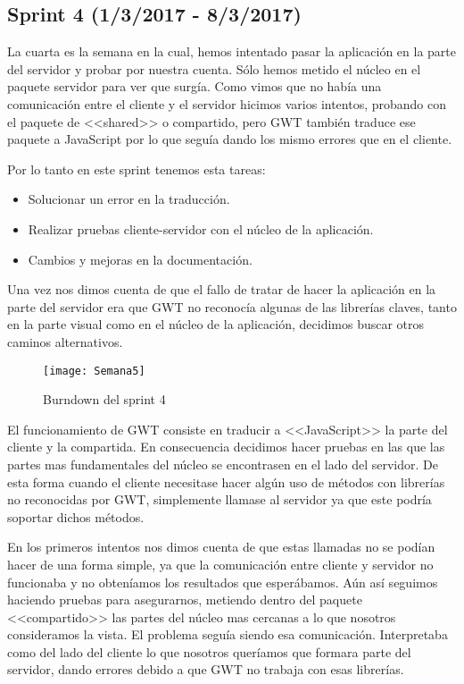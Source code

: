 \subsection{Sprint 4 (1/3/2017 - 8/3/2017)}
La cuarta es la semana en la cual, hemos intentado pasar la aplicación en la parte del servidor y probar por nuestra cuenta. Sólo hemos metido el núcleo en el paquete servidor para ver que surgía. Como vimos que no había una comunicación entre el cliente y el servidor hicimos varios intentos, probando con el paquete de <<shared>> o compartido, pero GWT también traduce ese paquete a JavaScript por lo que seguía dando los mismo errores que en el cliente.

Por lo tanto en este sprint tenemos esta tareas:

\begin{itemize}
\item Solucionar un error en la traducción.
\item Realizar pruebas cliente-servidor con el núcleo de la aplicación.
\item Cambios y mejoras en la documentación.
\end{itemize}

Una vez nos dimos cuenta de que el fallo de tratar de hacer la aplicación en la parte del servidor era que GWT no reconocía algunas de las librerías claves, tanto en la parte visual como en el núcleo de la aplicación, decidimos buscar otros caminos alternativos. 


\begin{figure}[h]
\centering
\texttt{[image: Semana5]}
\caption{Burndown del sprint 4}
\label{fig:A.2.6}
\end{figure}

El funcionamiento de GWT consiste en traducir a <<JavaScript>> la parte del cliente y la compartida. En consecuencia decidimos hacer pruebas en las que las partes mas fundamentales del núcleo se encontrasen en el lado del servidor. De esta forma cuando el cliente necesitase hacer algún uso de métodos con librerías no reconocidas por GWT, simplemente llamase al servidor ya que este podría soportar dichos métodos. 

En los primeros intentos nos dimos cuenta de que estas llamadas no se podían hacer de una forma simple, ya que la comunicación entre cliente y servidor no funcionaba y no obteníamos los resultados que esperábamos. Aún así seguimos haciendo pruebas para asegurarnos, metiendo dentro del paquete <<compartido>> las partes del núcleo mas cercanas a lo que nosotros consideramos la vista. El problema seguía siendo esa comunicación. Interpretaba como del lado del cliente lo que nosotros queríamos que formara parte del servidor, dando errores debido a que GWT no trabaja con esas librerías.

